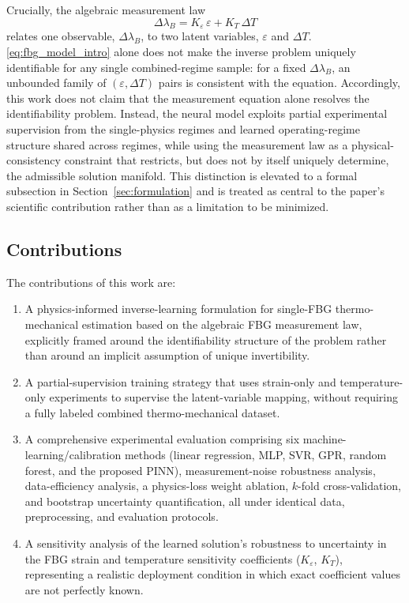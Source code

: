 \documentclass[journal,twoside,web]{ieeecolor}
\begin{document}
Crucially, the algebraic measurement law
\begin{equation}
\Delta \lambda_B = K_{\varepsilon}\,\varepsilon + K_T\,\Delta T
\label{eq:fbg_model_intro}
\end{equation}
relates one observable, $\Delta\lambda_B$, to two latent variables,
$\varepsilon$ and $\Delta T$. \eqref{eq:fbg_model_intro} alone does not make
the inverse problem uniquely identifiable for any single combined-regime
sample: for a fixed $\Delta\lambda_B$, an unbounded family of
$(\varepsilon,\Delta T)$ pairs is consistent with the equation. Accordingly,
this work does not claim that the measurement equation alone resolves the
identifiability problem. Instead, the neural model exploits partial
experimental supervision from the single-physics regimes and learned
operating-regime structure shared across regimes, while using the
measurement law as a physical-consistency constraint that restricts, but
does not by itself uniquely determine, the admissible solution manifold.
This distinction is elevated to a formal subsection in
Section~\ref{sec:formulation} and is treated as central to the paper's
scientific contribution rather than as a limitation to be minimized.

\subsection{Contributions}

The contributions of this work are:
\begin{enumerate}
\item[C1] A physics-informed inverse-learning formulation for single-FBG
thermo-mechanical estimation based on the algebraic FBG measurement law,
explicitly framed around the identifiability structure of the problem
rather than around an implicit assumption of unique invertibility.
\item[C2] A partial-supervision training strategy that uses strain-only and
temperature-only experiments to supervise the latent-variable mapping,
without requiring a fully labeled combined thermo-mechanical dataset.
\item[C3] A comprehensive experimental evaluation comprising six
machine-learning/calibration methods (linear regression, MLP, SVR, GPR,
random forest, and the proposed PINN), measurement-noise robustness
analysis, data-efficiency analysis, a physics-loss weight ablation,
$k$-fold cross-validation, and bootstrap uncertainty quantification, all
under identical data, preprocessing, and evaluation protocols.
\item[C4] A sensitivity analysis of the learned solution's robustness to
uncertainty in the FBG strain and temperature sensitivity coefficients
($K_\varepsilon$, $K_T$), representing a realistic deployment condition in
which exact coefficient values are not perfectly known.
\end{enumerate}
\end{document}
